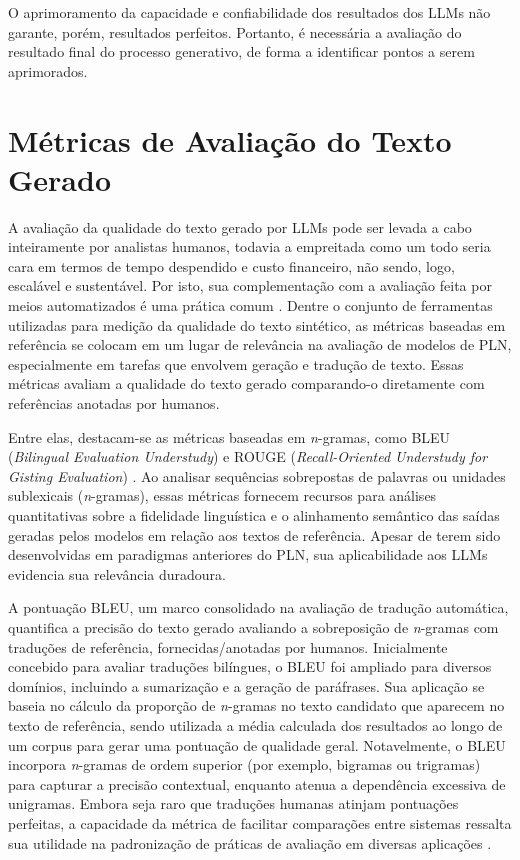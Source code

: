 O aprimoramento da capacidade e confiabilidade dos resultados dos \ac{LLM}s não garante, porém, resultados perfeitos. Portanto, é necessária a avaliação do resultado final do processo generativo, de forma a identificar pontos a serem aprimorados.

\section{Métricas de Avaliação do Texto Gerado}
\label{sec:Teorico.7}

A avaliação da qualidade do texto gerado por \ac{LLM}s pode ser levada a cabo inteiramente por analistas humanos, todavia a empreitada como um todo seria cara em termos de tempo despendido e custo financeiro, não sendo, logo, escalável e sustentável. Por isto, sua complementação com a avaliação feita por meios automatizados é uma prática comum \cite{MetricasAvaliacaoTexto:1}. Dentre o conjunto de ferramentas utilizadas para medição da qualidade do texto sintético, as métricas baseadas em referência se colocam em um lugar de relevância na avaliação de modelos de \ac{PLN}, especialmente em tarefas que envolvem geração e tradução de texto. Essas métricas avaliam a qualidade do texto gerado comparando-o diretamente com referências anotadas por humanos.

Entre elas, destacam-se as métricas baseadas em \textit{n}-gramas, como BLEU (\textit{Bilingual Evaluation Understudy}) e ROUGE (\textit{Recall-Oriented Understudy for Gisting Evaluation}) \cite{BLEU:1,ROUGE:1}. Ao analisar sequências sobrepostas de palavras ou unidades sublexicais (\textit{n}-gramas), essas métricas fornecem recursos para análises quantitativas sobre a fidelidade linguística e o alinhamento semântico das saídas geradas pelos modelos em relação aos textos de referência. Apesar de terem sido desenvolvidas em paradigmas anteriores do \ac{PLN}, sua aplicabilidade aos \ac{LLM}s evidencia sua relevância duradoura.

A pontuação BLEU, um marco consolidado na avaliação de tradução automática, quantifica a precisão do texto gerado avaliando a sobreposição de \textit{n}-gramas com traduções de referência, fornecidas/anotadas por humanos. Inicialmente concebido para avaliar traduções bilíngues, o BLEU foi ampliado para diversos domínios, incluindo a sumarização e a geração de paráfrases. Sua aplicação se baseia no cálculo da proporção de \textit{n}-gramas no texto candidato que aparecem no texto de referência, sendo utilizada a média calculada dos resultados ao longo de um corpus para gerar uma pontuação de qualidade geral. Notavelmente, o BLEU incorpora \textit{n}-gramas de ordem superior (por exemplo, bigramas ou trigramas) para capturar a precisão contextual, enquanto atenua a dependência excessiva de unigramas. Embora seja raro que traduções humanas atinjam pontuações perfeitas, a capacidade da métrica de facilitar comparações entre sistemas ressalta sua utilidade na padronização de práticas de avaliação em diversas aplicações \cite{BLEU:1}.

